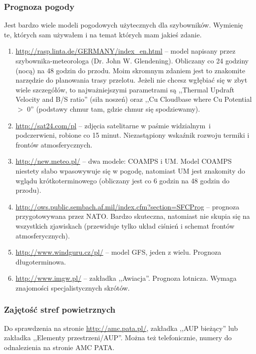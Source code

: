 \documentclass{article}
\begin{document}
\subsubsection{Prognoza pogody}
Jest bardzo wiele modeli pogodowych użytecznych dla szybowników. Wymienię
te, których sam używałem i na temat których mam jakieś zdanie.
\begin{enumerate}
\item \url{http://rasp.linta.de/GERMANY/index_en.html} -- model napisany
przez szybownika-meteorologa (Dr. John W. Glendening).
Obliczany co 24 godziny (nocą) na 48 godzin do przodu. Moim skromnym
zdaniem jest to znakomite narzędzie do planowania trasy przelotu.
Jeżeli nie chcesz wgłębiać się w zbyt wiele szczegółów, to najważniejszymi
parametrami są ,,Thermal Updraft Velocity and B/S ratio'' (siła noszeń) oraz
,,Cu Cloudbase where Cu Potential $>$ 0'' (podstawy chmur tam, gdzie chmur
się spodziewamy).

\item \url{http://sat24.com/pl} -- zdjęcia satelitarne w paśmie widzialnym~i
podczerwieni, robione co 15 minut. Niezastąpiony wskaźnik rozwoju termiki
i frontów atmosferycznych.

\item \url{http://new.meteo.pl/} -- dwa modele: COAMPS i UM. Model COAMPS
niestety słabo wpasowywuje się w pogodę, natomiast UM jest znakomity do
wglądu krótkoterminowego (obliczany jest co 6 godzin na 48 godzin do przodu).

\item \url{http://ows.public.sembach.af.mil/index.cfm?section=SFCProg} -- 
prognoza przygotowywana przez NATO. Bardzo skuteczna, natomiast nie
skupia się na wszystkich zjawiskach (przewiduje tylko układ ciśnień i
schemat frontów atmosferycznych).

\item \url{http://www.windguru.cz/pl/} -- model GFS, jeden z wielu.
Prognoza długoterminowa.

\item \url{http://www.imgw.pl/} -- zakładka ,,Awiacja''. Prognoza lotnicza.
Wymaga znajomości specjalistycznych skrótów.

\end{enumerate}
\subsubsection{Zajętość stref powietrznych}
Do sprawdzenia na stronie \url{http://amc.pata.pl/}, zakładka
,,AUP bieżący'' lub zakładka ,,Elementy przestrzeni/AUP''. Można też
telefonicznie, numery do odnalezienia na stronie AMC PATA.
\end{document}

